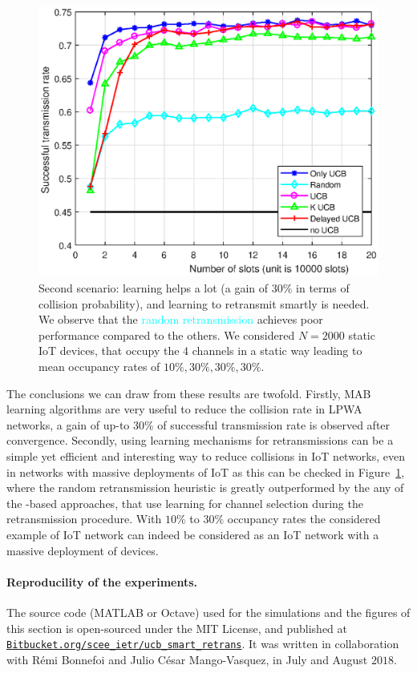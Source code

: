 \begin{figure}[h!]  %
	\centering
	\includegraphics[width=0.80\linewidth]{ResultsUCB2.eps}
	\caption[Second comparison between the exposed heuristics for the retransmission: ``Only \UCB'', ``Random'', ``\UCB'', ``$K$ \UCB'', and ``Delayed \UCB''.]{
		Second scenario: learning helps a lot (a gain of $30\%$ in terms of collision probability), and learning to retransmit smartly is needed.
		We observe that the \textcolor{cyan}{random retransmission} achieves poor performance compared to the others.
		We considered $N=2000$ static IoT devices, that occupy the $4$ channels in a static way leading to mean occupancy rates of $10\%,30\%,30\%,30\%$.
	}
	\label{fig:43:mainExperiment2}
\end{figure}

The conclusions we can draw from these results are twofold.
Firstly, MAB learning algorithms are very useful to reduce the collision rate in LPWA networks, a gain of up-to $30\%$ of successful transmission rate is observed after convergence.
Secondly, using learning mechanisms for retransmissions can be a simple yet efficient and interesting way to reduce collisions in IoT networks, even in networks with massive deployments of IoT as this can be checked in Figure~\ref{fig:43:mainExperiment2}, where the random retransmission heuristic is greatly outperformed by the any of the \UCB-based approaches, that use learning for channel selection during the retransmission procedure.
With $10\%$ to $30\%$ occupancy rates the considered example of IoT network can indeed be considered as an IoT network with a massive deployment of devices.


\paragraph{Reproducility of the experiments.}
%
The source code (MATLAB or Octave) used for the simulations and the figures of this section is open-sourced under the MIT License, and published at \href{https://Bitbucket.org/scee_ietr/ucb_smart_retrans}{\texttt{Bitbucket.org/scee\_ietr/ucb\_smart\_retrans}}.
It was written in collaboration with Rémi Bonnefoi and Julio César Mango-Vasquez, in July and August $2018$.
